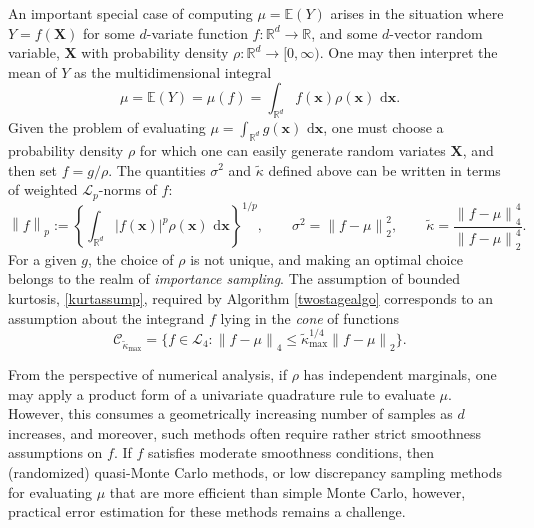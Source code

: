 \documentclass[graybox]{svmult}
\newcommand\reals{\mathbb{R}}
\newcommand\e{\mathbb{E}}
\newcommand{\vx}{\boldsymbol{x}}
\newcommand{\vX}{\boldsymbol{X}}
\newcommand{\rd}{\,\mathrm{d}}
\newcommand{\abs}[1]{\left|#1\right|}
\newcommand{\dif}{\rd}
\newcommand{\tkappa}{\tilde{\kappa}}
\newcommand{\cc}{\mathcal{C}}
\newcommand{\cl}{\mathcal{L}}
\def\abs#1{\ensuremath{\left \lvert #1 \right \rvert}}
\newcommand{\norm}[2][{}]{\ensuremath{\left \lVert #2 \right \rVert}_{#1}}
\begin{document}
An important special case of computing $\mu=\e(Y)$ arises in the situation where $Y=f(\vX)$ for some  $d$-variate function $f: \reals^d \to \reals$, and some $d$-vector random variable, $\vX$ with probability density $\rho: \reals^d \to [0,\infty)$.  One may then interpret the mean of $Y$ as the multidimensional integral 
\begin{equation} \label{muintegral}
\mu=\e(Y)= \mu(f) = \int_{\reals^d} f(\vx) \rho(\vx) \, \dif \vx.
\end{equation}
Given the problem of evaluating $\mu=\int_{\reals^d} g(\vx) \, \dif \vx$, one must choose a probability density $\rho$ for which one can easily generate random variates $\vX$, and then set $f = g/\rho$.  The quantities $\sigma^2$ and $\tkappa$ defined above can be written in terms of weighted $\cl_p$-norms of $f$:
\begin{equation} \label{Lpnormdef}
\norm[p]{f} :=\left\{\int_{\reals^d} \abs{f(\vx)}^p \rho(\vx) \, \dif \vx\right\}^{1/p}, \qquad
\sigma^2 = \norm[2]{f-\mu}^2, \qquad \tkappa = \frac{\norm[4]{f-\mu}^4}{\norm[2]{f-\mu}^4}.
\end{equation}
For a given $g$, the choice of $\rho$ is not unique, and making an optimal choice belongs to the realm of \emph{importance sampling}. The assumption of bounded kurtosis, \eqref{kurtassump}, required by Algorithm \ref{twostagealgo} corresponds to an assumption about the integrand $f$ lying in the \emph{cone} of functions
\begin{equation} \label{conedef}
\cc_{\tkappa_{\max}} = \{ f \in \cl_4 : \norm[4]{f-\mu} \le \tkappa_{\max}^{1/4} \norm[2]{f-\mu} \}.
\end{equation}

From the perspective of numerical analysis, if $\rho$ has independent marginals, one may apply a product form of a univariate quadrature rule to evaluate $\mu$.  However, this consumes a geometrically increasing number of samples as $d$ increases, and moreover, such methods often require rather strict smoothness assumptions on $f$.  If $f$ satisfies moderate smoothness conditions, then (randomized) quasi-Monte Carlo methods, or low discrepancy sampling \citep{Nie92,SloJoe94,Lem09a,DicPil10a} methods for evaluating $\mu$ that are more efficient than simple Monte Carlo, however, practical error estimation for these methods remains a challenge.
\end{document}
